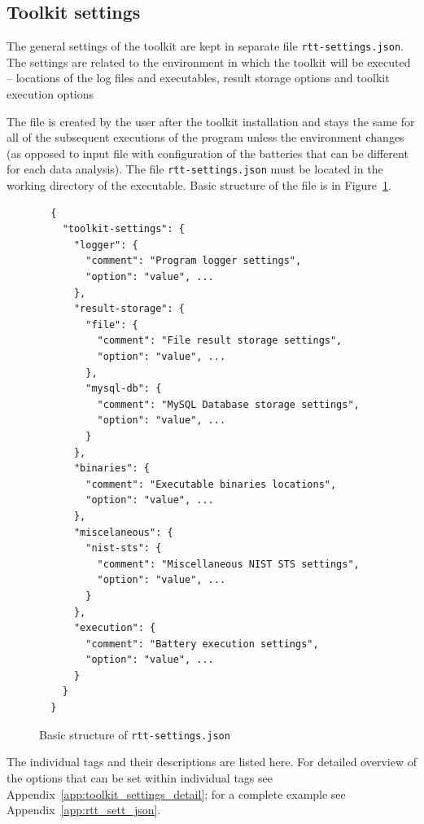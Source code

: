 \documentclass[
  digital,  	%
  color,		%
  oneside,   	%
  12pt,
  nocover,
  notable,
  nolof,
  nolot,
]{fithesis3}
\theoremstyle{definition}
\theoremstyle{remark}
\begin{document}
\subsection{Toolkit settings}
The general settings of the toolkit are kept in separate file \texttt{rtt-settings.json}. The settings are related to the environment in which the toolkit will be executed -- locations of the log files and executables, result storage options and toolkit execution options 

The file is created by the user after the toolkit installation and stays the same for all of the subsequent executions of the program unless the environment changes (as opposed to input file with configuration of the batteries that can be different for each data analysis). The file \texttt{rtt-settings.json} must be located in the working directory of the executable. Basic structure of the file is in Figure~\ref{fig:rtt_sett_short_json}.

\begin{figure}[h!]
\begin{verbatim}
  {
    "toolkit-settings": {
      "logger": {
        "comment": "Program logger settings",
        "option": "value", ...
      },
      "result-storage": {
        "file": {
          "comment": "File result storage settings",
          "option": "value", ...
        },
        "mysql-db": {
          "comment": "MySQL Database storage settings",
          "option": "value", ...
        }
      },
      "binaries": {
        "comment": "Executable binaries locations",
        "option": "value", ...
      },    
      "miscelaneous": {
        "nist-sts": {
          "comment": "Miscellaneous NIST STS settings",
          "option": "value", ...
        }
      },
      "execution": {
        "comment": "Battery execution settings",
        "option": "value", ...
      }
    }
  }
\end{verbatim}
\caption{Basic structure of \texttt{rtt-settings.json}}
\label{fig:rtt_sett_short_json}
\end{figure}

The individual tags and their descriptions are listed here. For detailed overview of the options that can be set within individual tags see Appendix~\ref{app:toolkit_settings_detail}; for a complete example see Appendix~\ref{app:rtt_sett_json}. 
\end{document}
